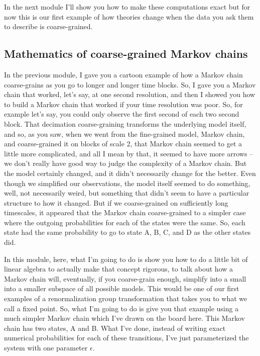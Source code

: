 \documentclass[]{article}
\begin{document}
In the next module
I'll show you how to make
these computations exact
but for now this is our first
example of how theories change when the
data you ask them to describe is
coarse-grained.

\subsection{Mathematics of coarse-grained Markov chains}

In the previous module,
I gave you a cartoon example
of how a Markov chain coarse-grains
as you go to longer
and longer time blocks.
So, I gave you a Markov chain
that worked, let’s say,
at one second resolution,
and then I showed you
how to build a Markov chain
that worked if your time
resolution was poor.
So, for example let’s say,
you could only observe the first second
of each two second block.
That decimation coarse-graining
transforms the underlying model itself,
and so, as you saw,
when we went from the fine-grained model,
Markov chain,
and coarse-grained it
on blocks of scale 2,
that Markov chain seemed to get
a little more complicated,
and all I mean by that,
it seemed to have more arrows –
we don’t really have good way
to judge the complexity of a Markov chain.
But the model certainly changed,
and it didn't necessarily
change for the better.
Even though we simplified
our observations,
the model itself seemed to do something,
well, not necessarily weird,
but something that didn't seem to have
a particular structure to how it changed.
But if we coarse-grained
on sufficiently long timescales,
it appeared that the Markov chain
coarse-grained to a simpler case
where the outgoing probabilities
for each of the states were the same.
So, each state had the same probability
to go to state A, B, C, and D
as the other states did.

In this module, here, what I’m going to do
is show you how to do
a little bit of linear algebra
to actually make that concept rigorous,
to talk about how a Markov
chain will, eventually,
if you coarse-grain enough,
simplify into a small into a smaller
subspace of all possible models.
This would be one of our first examples
of a renormalization group transformation
that takes you
to what we call a fixed point.
So, what I’m going to do
is give you that example
using a much simpler Markov chain
which I’ve drawn on the board here.
This Markov chain has two states, A and B.
What I’ve done,
instead of writing
exact numerical probabilities
for each of these transitions,
I’ve just parameterized the system
with one parameter $\epsilon$.
\end{document}
